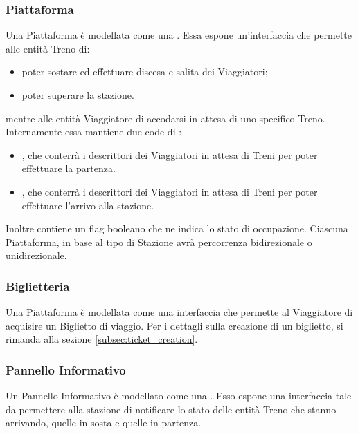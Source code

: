 		\subsubsection{Piattaforma}
	
		Una Piattaforma è modellata come una . Essa espone un'interfaccia che permette alle entità Treno di:
		\begin{itemize}
			\item poter sostare ed effettuare discesa e salita dei Viaggiatori;
			\item poter superare la stazione.
		\end{itemize}
	mentre alle entità Viaggiatore di accodarsi in attesa di uno specifico Treno.
		Internamente essa mantiene due code di :
		\begin{itemize}
			\item {}, che conterrà i descrittori dei Viaggiatori in attesa di Treni per poter effettuare la partenza.
			\item {}, che conterrà i descrittori dei Viaggiatori in attesa di Treni per poter effettuare l'arrivo alla stazione.
		\end{itemize}
		Inoltre contiene un flag booleano  che ne indica lo stato di occupazione.
		Ciascuna Piattaforma, in base al tipo di Stazione avrà percorrenza bidirezionale o unidirezionale.
				
		\subsubsection{Biglietteria}
		
		Una Piattaforma è modellata come una interfaccia che permette al Viaggiatore di acquisire un Biglietto di viaggio. Per i dettagli sulla creazione di un biglietto, si rimanda alla sezione \ref{subsec:ticket_creation}. 
		
		\subsubsection{Pannello Informativo}
		
		Un Pannello Informativo è modellato come una . Esso espone una interfaccia tale da permettere alla stazione di notificare lo stato delle entità Treno che stanno arrivando, quelle in sosta e quelle in partenza.
\newpage
